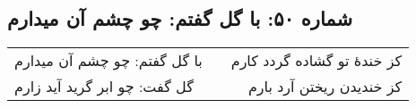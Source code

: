 \begin{center}
\section*{شماره ۵۰: با گل گفتم: چو چشم آن میدارم}
\label{sec:050}
\begin{longtable}{l p{0.5cm} r}
با گل گفتم: چو چشم آن میدارم
&&
کز خندهٔ تو گشاده گردد کارم
\\
گل گفت: چو ابر گرید آید زارم
&&
کز خندیدن ریختن آرد بارم
\\
\end{longtable}
\end{center}
